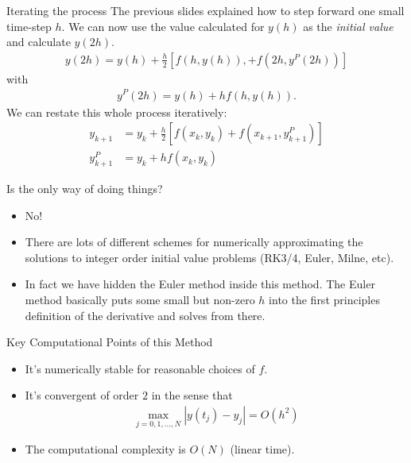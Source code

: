 \documentclass[pdf]{beamer}
\begin{document}
\begin{frame}{Iterating the process}
    The previous slides explained how to step forward one small time-step $ h $. We can now use the value calculated for $ y(h) $ as the \emph{initial value} and calculate $ y(2h) $.
    \begin{align*}
        y(2h) = y(h) + \frac{h}{2} \left[ f(h, y(h)), + f(2h, y^{P}(2h)) \right]
    \end{align*}
    with 
    \begin{align*}
        y^P(2h) = y(h) + hf(h, y(h)).
    \end{align*}
    We can restate this whole process iteratively:
    \begin{align*}
        y_{k+1} &= y_{k} + \frac{h}{2} \left[ f(x_k, y_k) + f(x_{k+1}, y_{k+1}^{P} ) \right] \\
        y^{P}_{k+1} &= y_k + hf(x_k, y_k)
    \end{align*}
\end{frame}

\begin{frame}{Is the only way of doing things?}
\begin{itemize}
    \item No! 
    
    \item There are lots of different schemes for numerically approximating the solutions to integer order initial value problems (RK3/4, Euler, Milne, etc).
    
    \item In fact we have hidden the Euler method inside this method. The Euler method basically puts some small but non-zero $ h $ into the first principles definition of the derivative and solves from there.
    
\end{itemize}

\end{frame}

\begin{frame}{Key Computational Points of this Method}
\begin{itemize}
    \item It's numerically stable for reasonable choices of $ f $.
    \item It's convergent of order $ 2 $ in the sense that 
    \begin{align*}
        \max_{j=0,1,...,N} | y(t_j) - y_j | = O(h^2) 
    \end{align*}
    \item The computational complexity is $ O(N) $ (linear time).
\end{itemize}
 
\end{frame}
\end{document}

